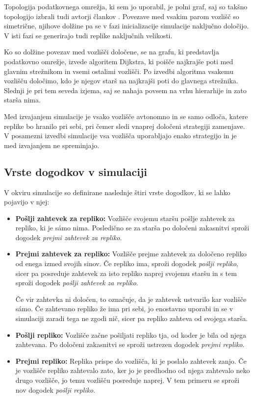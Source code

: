 \documentclass[a4paper, 12pt]{book}
\begin{document}
Topologija podatkovnega omrežja, ki sem jo uporabil, je polni graf, saj so
takšno topologijo izbrali tudi avtorji člankov \cite{efs2011, mfs2012}.
Povezave med vsakim parom vozlišč so simetrične, njihove dolžine pa se v fazi
inicializacije simulacije naključno določijo. V isti fazi se generirajo tudi
replike naključnih velikosti.

Ko so dolžine povezav med vozlišči določene, se na grafu, ki predstavlja
podatkovno omrežje, izvede algoritem Dijkstra, ki poišče najkrajše poti med
glavnim strežnikom in vsemi ostalimi vozlišči. Po izvedbi algoritma vsakemu
vozlišču določimo, kdo je njegov starš na najkrajši poti do glavnega strežnika.
Slednji je pri tem seveda izjema, saj se nahaja povsem na vrhu hierarhije in
zato starša nima.

Med izvajanjem simulacije je vsako vozlišče avtonomno in se samo odloča, katere
replike bo hranilo pri sebi, pri čemer sledi vnaprej določeni strategiji
zamenjave. V posamezni izvedbi simulacije vsa vozlišča uporabljajo enako
strategijo in je med izvajanjem ne spreminjajo.

\subsection{Vrste dogodkov v simulaciji}
V okviru simulacije so definirane naslednje štiri vrste dogodkov, ki se lahko
pojavijo v njej:
\begin{itemize}
  \item \textbf{Pošlji zahtevek za repliko:} Vozlišče svojemu staršu pošlje
  zahtevek za repliko, ki je sámo nima. Posledično se za starša po določeni
  zakasnitvi sproži dogodek \textit{prejmi zahtevek za repliko}.

  \item \textbf{Prejmi zahtevek za repliko:} Vozlišče prejme zahtevek za
  določeno repliko od enega izmed svojih sinov. Če repliko ima, sproži dogodek
  \textit{pošlji repliko}, sicer pa posreduje zahtevek za isto repliko
  naprej svojemu staršu in s tem sproži dogodek \textit{pošlji zahtevek za
  repliko}.

  Če vir zahtevka ni določen, to označuje, da je zahtevek ustvarilo kar
  vozlišče sámo. Če zahtevano repliko že ima pri sebi, jo enostavno
  uporabi in se v simulaciji zaradi tega ne zgodi nič, sicer pa repliko
  zahteva od svojega starša.

  \item \textbf{Pošlji repliko:} Vozlišče začne pošiljati repliko tja, od
  koder je bila od njega zahtevana. Po določeni zakasnitvi se sproži ustrezen
  dogodek \textit{prejmi repliko}.

  \item \textbf{Prejmi repliko:} Replika prispe do vozlišča, ki je poslalo
  zahtevek zanjo. Če je vozlišče repliko zahtevalo zato, ker jo je predhodno
  od njega zahtevalo neko drugo vozlišče, jo temu vozlišču posreduje naprej.
  V tem primeru se sproži nov dogodek \textit{pošlji repliko}.
\end{itemize}
\end{document}
